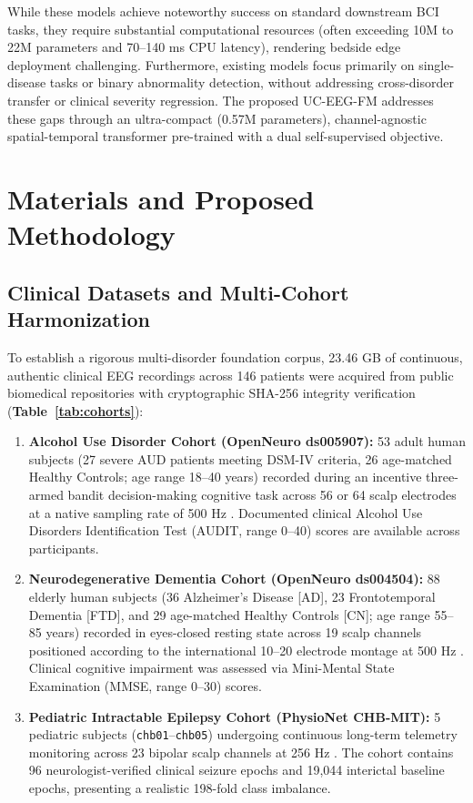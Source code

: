 \documentclass[11pt,a4paper]{article}
\begin{document}
While these models achieve noteworthy success on standard downstream BCI tasks, they require substantial computational resources (often exceeding 10M to 22M parameters and 70--140 ms CPU latency), rendering bedside edge deployment challenging. Furthermore, existing models focus primarily on single-disease tasks or binary abnormality detection, without addressing cross-disorder transfer or clinical severity regression. The proposed UC-EEG-FM addresses these gaps through an ultra-compact (0.57M parameters), channel-agnostic spatial-temporal transformer pre-trained with a dual self-supervised objective.

\section{Materials and Proposed Methodology}
\label{sec:methods}

\subsection{Clinical Datasets and Multi-Cohort Harmonization}
To establish a rigorous multi-disorder foundation corpus, 23.46 GB of continuous, authentic clinical EEG recordings across 146 patients were acquired from public biomedical repositories with cryptographic SHA-256 integrity verification (\textbf{Table~\ref{tab:cohorts}}):
\begin{enumerate}
    \item \textbf{Alcohol Use Disorder Cohort (OpenNeuro ds005907):} 53 adult human subjects (27 severe AUD patients meeting DSM-IV criteria, 26 age-matched Healthy Controls; age range 18--40 years) recorded during an incentive three-armed bandit decision-making cognitive task across 56 or 64 scalp electrodes at a native sampling rate of 500 Hz \cite{openneuro_ds005907}. Documented clinical Alcohol Use Disorders Identification Test (AUDIT, range 0--40) scores are available across participants.
    \item \textbf{Neurodegenerative Dementia Cohort (OpenNeuro ds004504):} 88 elderly human subjects (36 Alzheimer's Disease [AD], 23 Frontotemporal Dementia [FTD], and 29 age-matched Healthy Controls [CN]; age range 55--85 years) recorded in eyes-closed resting state across 19 scalp channels positioned according to the international 10--20 electrode montage at 500 Hz \cite{miltiadous2023dementia}. Clinical cognitive impairment was assessed via Mini-Mental State Examination (MMSE, range 0--30) scores.
    \item \textbf{Pediatric Intractable Epilepsy Cohort (PhysioNet CHB-MIT):} 5 pediatric subjects (\texttt{chb01}--\texttt{chb05}) undergoing continuous long-term telemetry monitoring across 23 bipolar scalp channels at 256 Hz \cite{goldberger2000chbmit}. The cohort contains 96 neurologist-verified clinical seizure epochs and 19,044 interictal baseline epochs, presenting a realistic 198-fold class imbalance.
\end{enumerate}
\end{document}
